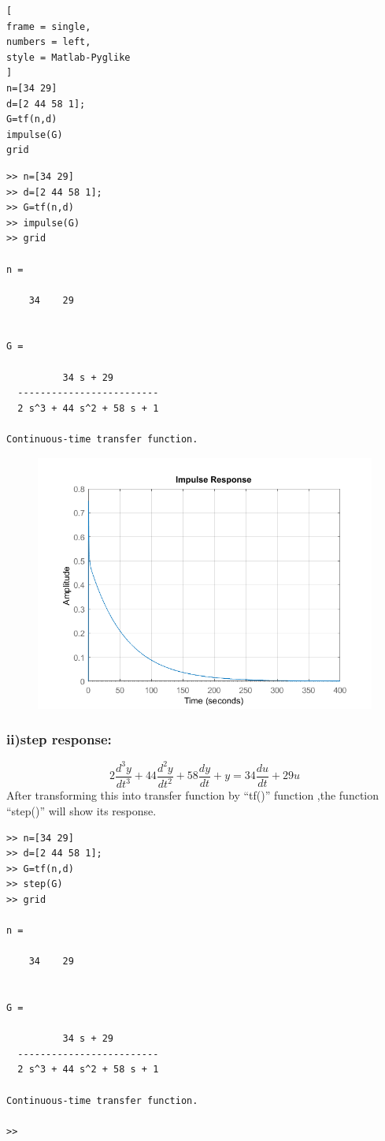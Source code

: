\documentclass[conference]{IEEEtran}
\begin{document}
\begin{lstlisting}[
frame = single,
numbers = left,
style = Matlab-Pyglike
]
n=[34 29]
d=[2 44 58 1];
G=tf(n,d)
impulse(G)
grid
\end{lstlisting}

\begin{verbatim}
>> n=[34 29]
>> d=[2 44 58 1];
>> G=tf(n,d)
>> impulse(G)
>> grid

n =

    34    29


G =
 
          34 s + 29
  -------------------------
  2 s^3 + 44 s^2 + 58 s + 1
 
Continuous-time transfer function.
\end{verbatim}



\begin{figure}[h!]
    \centering
    \includegraphics[width=\linewidth]{fig2.png}
    \label{fig:my_label}
\end{figure}



\subsubsection{ii)step response:}
\[2\frac{d^3y}{dt^3} + 44\frac{d^2y}{dt^2} +58 \frac{dy}{dt} + y = 34\frac{du}{dt} +29u\]
After transforming this into transfer function by “tf()” function ,the function “step()” will show its response.

\begin{verbatim}
>> n=[34 29]
>> d=[2 44 58 1];
>> G=tf(n,d)
>> step(G)
>> grid

n =

    34    29


G =
 
          34 s + 29
  -------------------------
  2 s^3 + 44 s^2 + 58 s + 1
 
Continuous-time transfer function.

>> 
\end{verbatim}
\end{document}
